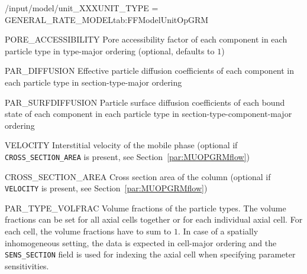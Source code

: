 \begin{condsubgroup}{/input/model/unit\_XXX}{UNIT\_TYPE = GENERAL\_RATE\_MODEL}{tab:FFModelUnitOpGRM}
\begin{dataset}
  \end{dataset}
  \begin{dataset}[unit=--,type=double,range={$(0, 1]$},length={$\texttt{NPARTYPE} \cdot \texttt{NCOMP}$}]{PORE\_ACCESSIBILITY}
    Pore accessibility factor of each component in each particle type in type-major ordering (optional, defaults to $1$)
  \end{dataset}
  \begin{dataset}[unit=\si{\square\metre\of{MP}\per\second},type=double,range={$\geq 0$},length={$\texttt{NPARTYPE} \cdot \texttt{NCOMP}$ / $\texttt{NSEC} \cdot \texttt{NPARTYPE} \cdot \texttt{NCOMP}$}]{PAR\_DIFFUSION}
    Effective particle diffusion coefficients of each component in each particle type in section-type-major ordering
  \end{dataset}
  \begin{dataset}[unit=\si{\square\metre\of{SP}\per\second},type=double,range={$\geq 0$},length={$\texttt{NTOTALBND}$ / $\texttt{NSEC} \cdot \texttt{NTOTALBND}$}]{PAR\_SURFDIFFUSION}
    Particle surface diffusion coefficients of each bound state of each component in each particle type in section-type-component-major ordering
  \end{dataset}
  \begin{dataset}[unit=\si{\metre\per\second},type=double,range={$\mathds{R}$},length={1 / \texttt{NSEC}}]{VELOCITY}
    Interstitial velocity of the mobile phase (optional if \texttt{CROSS\_SECTION\_AREA} is present, see Section~\ref{par:MUOPGRMflow})
  \end{dataset}
  \begin{dataset}[unit=\si{\square\metre},type=double,range={$>0$},length={1}]{CROSS\_SECTION\_AREA}
    Cross section area of the column (optional if \texttt{VELOCITY} is present, see Section~\ref{par:MUOPGRMflow})
  \end{dataset}
  \begin{dataset}[unit=--,type=double,range={$[0,1]$},length={\texttt{NPARTYPE} / $\texttt{NCOL} \cdot \texttt{NPARTYPE}$}]{PAR\_TYPE\_VOLFRAC}
    Volume fractions of the particle types.
    The volume fractions can be set for all axial cells together or for each individual axial cell.
    For each cell, the volume fractions have to sum to $1$.
    In case of a spatially inhomogeneous setting, the data is expected in cell-major ordering and the \texttt{SENS\_SECTION} field is used for indexing the axial cell when specifying parameter sensitivities.
  \end{dataset}
\end{condsubgroup}

